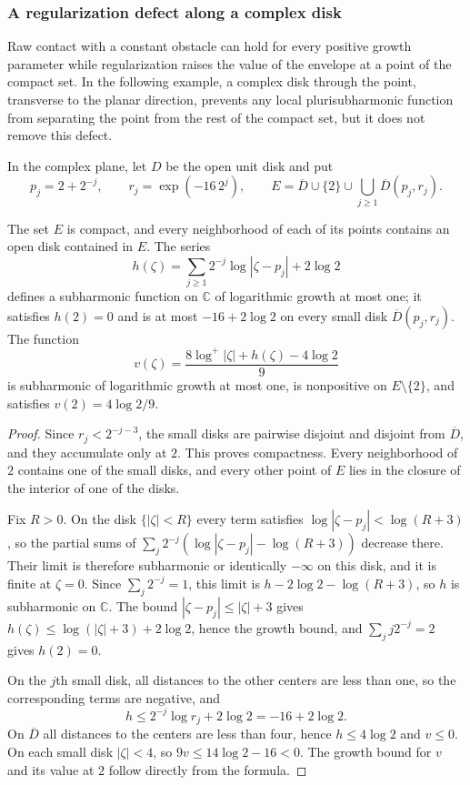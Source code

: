 \subsubsection{A regularization defect along a complex disk}
\label{sec:affine-contact-defect}

Raw contact with a constant obstacle can hold for every positive growth parameter while regularization raises the value of the envelope at a point of the compact set. In the following example, a complex disk through the point, transverse to the planar direction, prevents any local plurisubharmonic function from separating the point from the rest of the compact set, but it does not remove this defect.

In the complex plane, let $D$ be the open unit disk and put
\[
 p_j=2+2^{-j},\qquad r_j=\exp(-16\,2^j),\qquad
 E=\overline D\cup\{2\}\cup\bigcup_{j\geq1}\overline D(p_j,r_j).
\]

\begin{lemma}\label{lem:planar-contact-barrier}
The set $E$ is compact, and every neighborhood of each of its points contains an open disk contained in $E$. The series
\[
 h(\zeta)=\sum_{j\geq1}2^{-j}\log|\zeta-p_j|+2\log2
\]
defines a subharmonic function on $\mathbb C$ of logarithmic growth at most one; it satisfies $h(2)=0$ and is at most $-16+2\log2$ on every small disk $\overline D(p_j,r_j)$. The function
\[
 v(\zeta)=\frac{8\log^+|\zeta|+h(\zeta)-4\log2}{9}
\]
is subharmonic of logarithmic growth at most one, is nonpositive on $E\setminus\{2\}$, and satisfies $v(2)=4\log2/9$.
\end{lemma}
\begin{proof}
Since $r_j<2^{-j-3}$, the small disks are pairwise disjoint and disjoint from $\overline D$, and they accumulate only at $2$. This proves compactness. Every neighborhood of $2$ contains one of the small disks, and every other point of $E$ lies in the closure of the interior of one of the disks.

Fix $R>0$. On the disk $\{|\zeta|<R\}$ every term satisfies $\log|\zeta-p_j|<\log(R+3)$, so the partial sums of $\sum_j2^{-j}(\log|\zeta-p_j|-\log(R+3))$ decrease there. Their limit is therefore subharmonic or identically $-\infty$ on this disk, and it is finite at $\zeta=0$. Since $\sum_j2^{-j}=1$, this limit is $h-2\log2-\log(R+3)$, so $h$ is subharmonic on $\mathbb C$. The bound $|\zeta-p_j|\leq|\zeta|+3$ gives $h(\zeta)\leq\log(|\zeta|+3)+2\log2$, hence the growth bound, and $\sum_jj2^{-j}=2$ gives $h(2)=0$.

On the $j$th small disk, all distances to the other centers are less than one, so the corresponding terms are negative, and
\[
 h\leq2^{-j}\log r_j+2\log2=-16+2\log2.
\]
On $\overline D$ all distances to the centers are less than four, hence $h\leq4\log2$ and $v\leq0$. On each small disk $|\zeta|<4$, so $9v\leq14\log2-16<0$. The growth bound for $v$ and its value at $2$ follow directly from the formula.
\end{proof}

